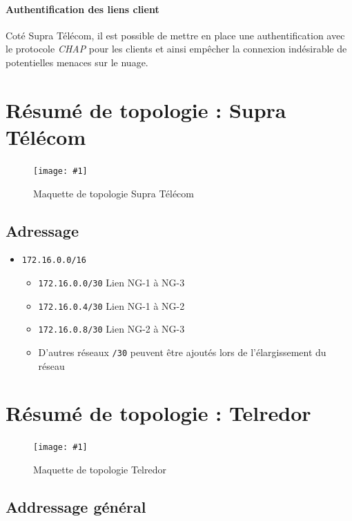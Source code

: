 \documentclass{article}
\newenvironment{figue}[1]{
	\par
	\bigskip
	\begin{figure}[h]
	\begin{center}
	  \texttt{[image: \#1]}
	\end{center}
}{
	\end{figure}
	\bigskip
}
\newcommand{\tlr}{Telredor\xspace}
\newcommand{\spr}{Supra Télécom\xspace}
\begin{document}
\paragraph{Authentification des liens client} Coté \spr, il est possible de mettre en place une authentification avec le protocole \emph{CHAP} pour les clients et ainsi empêcher la connexion indésirable de potentielles menaces sur le nuage.

\clearpage
\section{Résumé de topologie : \spr}

\begin{figue}{img/nuage-supra.pdf}
	\caption{Maquette de topologie \spr}
\end{figue}

\subsection{Adressage}

\begin{itemize}
	\item \texttt{172.16.0.0/16}
	\begin{itemize}
		\item \texttt{172.16.0.0/30} Lien NG-1 à NG-3
		\item \texttt{172.16.0.4/30} Lien NG-1 à NG-2
		\item \texttt{172.16.0.8/30} Lien NG-2 à NG-3
		\item D'autres réseaux \texttt{/30} peuvent être ajoutés lors de l'élargissement du réseau
	\end{itemize}
\end{itemize}



\section{Résumé de topologie : \tlr}

\begin{figue}{img/telredor.pdf}
	\caption{Maquette de topologie \tlr}
\end{figue}

\subsection{Addressage général}
\end{document}
